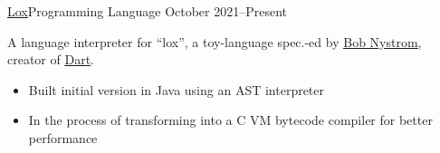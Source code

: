 \documentclass[10pt,a4paper,ragged2e,withhyper]{altacv}
\begin{document}
\begin{paracol}{2}
		\divider

		\cvevent
		{\href{https://github.com/jaacko-torus/lox}{\uline{Lox}}{\hr}Programming Language}
		{{\CVTagJava}{\CVTagC}}
		{October 2021--Present}{}
		\vspace{-0.3cm}
		\begin{justify}
			A language interpreter for ``lox'', a toy-language spec.-ed by \href{https://github.com/munificent}{\uline{Bob Nystrom}}, creator of \href{https://en.wikipedia.org/wiki/Dart_(programming_language)}{\uline{Dart}}.
		\end{justify}
		\vspace{-0.2cm}
		\smallskip
		\begin{itemize}
			\item Built initial version in Java using an AST interpreter
			\item In the process of transforming into a C VM bytecode compiler for better performance
		\end{itemize}


	\end{paracol}
\end{document}
